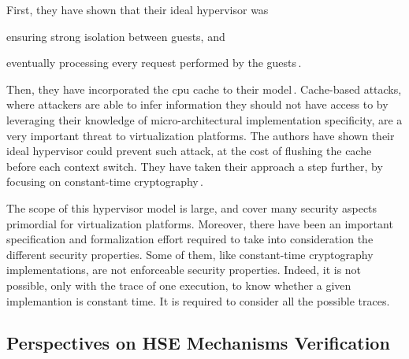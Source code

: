 First, they have shown that their ideal hypervisor was
%
\begin{inparaenum}[(1)]
\item ensuring strong isolation between guests, and
%
\item eventually processing every request performed by the
  guests\,\cite{barthe2011virtcert1}.
\end{inparaenum}
%
Then, they have incorporated the \ac{cpu} cache to their
model\,\cite{barthe2012virtcert2}.
%
Cache-based attacks, where attackers are able to infer information they should
not have access to by leveraging their knowledge of micro-architectural
implementation specificity, are a very important threat to virtualization
platforms.
%
The authors have shown their ideal hypervisor could prevent such attack, at the
cost of flushing the cache before each context switch.
%
They have taken their approach a step further, by focusing on constant-time
cryptography\,\cite{barthe2014virtcert3}.

The scope of this hypervisor model is large, and cover many security aspects
primordial for virtualization platforms.
%
Moreover, there have been an important specification and formalization effort
required to take into consideration the different security properties.
%
Some of them, like constant-time cryptography implementations, are not
enforceable security properties.
%
Indeed, it is not possible, only with the trace of one execution, to know
whether a given implemantion is constant time.
%
It is required to consider all the possible traces.

\subsection{Perspectives on HSE Mechanisms Verification}


